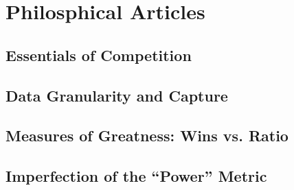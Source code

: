 \part{Philosphical Articles}
  \chapter{Essentials of Competition}
  \chapter{Data Granularity and Capture}
  \chapter{Measures of Greatness: Wins vs. Ratio}
  \chapter{Imperfection of the ``Power'' Metric}